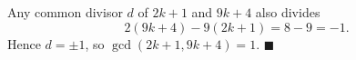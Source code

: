 Any common divisor $d$ of $2k+1$ and $9k+4$ also divides
\[2(9k+4)-9(2k+1)=8-9=-1.\]
Hence $d=\pm1$, so $\gcd(2k+1,9k+4)=1$. $\blacksquare$
